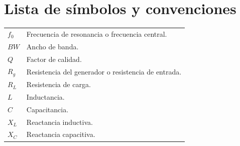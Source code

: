 \chapter*{Lista de símbolos y convenciones}

\begin{longtable}{p{3cm} p{10cm}}
$f_0$ & Frecuencia de resonancia o frecuencia central. \\
$BW$ & Ancho de banda. \\
$Q$ & Factor de calidad. \\
$R_g$ & Resistencia del generador o resistencia de entrada. \\
$R_L$ & Resistencia de carga. \\
$L$ & Inductancia. \\
$C$ & Capacitancia. \\
$X_L$ & Reactancia inductiva. \\
$X_C$ & Reactancia capacitiva. \\
\end{longtable}